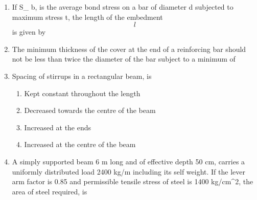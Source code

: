 \documentclass[11pt,a4paper]{article}
\begin{document}
\begin{enumerate}
\begin{enumerate}[label=\Alph*.]
\end{enumerate}
\item{If S\_ b, is the average bond stress on a bar of diameter d subjected to maximum stress t, the length of the embedment $$l$$ is given by
}
\\
\item{The minimum thickness of the cover at the end of a reinforcing bar should not be less than twice the diameter of the bar subject to a minimum of}
\\\begin{enumerate*}[itemjoin=\qquad, label=\Alph*.]
\item{10 mm}
\item{15 mm}
\item{20 mm}
\item{25 mm}
\end{enumerate*}
\item{Spacing of stirrups in a rectangular beam, is}
\begin{enumerate}[label=\Alph*.]
\item{Kept constant throughout the length}
\item{Decreased towards the centre of the beam}
\item{Increased at the ends}
\item{Increased at the centre of the beam}
\end{enumerate}
\item{A simply supported beam 6 m long and of effective depth 50 cm, carries a uniformly distributed load 2400 kg/m including its self weight. If the lever arm factor is 0.85 and permissible tensile stress of steel is 1400 kg/cm\^{}2, the area of steel required, is
}
\\
\end{enumerate}
\end{document}
